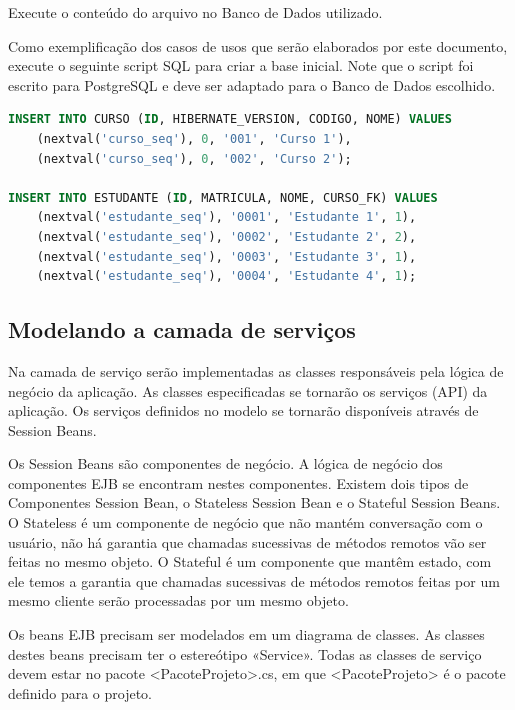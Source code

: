 Execute o conteúdo do arquivo no Banco de Dados utilizado.

Como exemplificação dos casos de usos que serão elaborados por este documento, execute o seguinte script SQL para criar a base inicial. Note que o script foi escrito para PostgreSQL e deve ser adaptado para o Banco de Dados escolhido.

\begin{lstlisting}[language=sql]
INSERT INTO CURSO (ID, HIBERNATE_VERSION, CODIGO, NOME) VALUES
	(nextval('curso_seq'), 0, '001', 'Curso 1'),
	(nextval('curso_seq'), 0, '002', 'Curso 2');

INSERT INTO ESTUDANTE (ID, MATRICULA, NOME, CURSO_FK) VALUES
	(nextval('estudante_seq'), '0001', 'Estudante 1', 1),
	(nextval('estudante_seq'), '0002', 'Estudante 2', 2),
	(nextval('estudante_seq'), '0003', 'Estudante 3', 1),
	(nextval('estudante_seq'), '0004', 'Estudante 4', 1);
\end{lstlisting}

\subsection{Modelando a camada de serviços}

Na camada de serviço serão implementadas as classes responsáveis pela lógica de negócio da aplicação. As classes especificadas se tornarão os serviços (API) da aplicação. Os serviços definidos no modelo se tornarão disponíveis através de Session Beans.

Os Session Beans são componentes de negócio. A lógica de negócio dos componentes EJB se encontram nestes componentes. Existem dois tipos de Componentes Session Bean, o Stateless Session Bean e o Stateful Session Beans. O Stateless é um componente de negócio que não mantém conversação com o usuário, não há garantia que chamadas sucessivas de métodos remotos vão ser feitas no mesmo objeto. O Stateful é um componente que mantêm estado, com ele temos a garantia que chamadas sucessivas de métodos remotos feitas por um mesmo cliente serão processadas por um mesmo objeto.

Os beans EJB precisam ser modelados em um diagrama de classes. As classes destes beans precisam ter o estereótipo «Service». Todas as classes de serviço devem estar no pacote <PacoteProjeto>.cs, em que <PacoteProjeto> é o pacote definido para o projeto.

